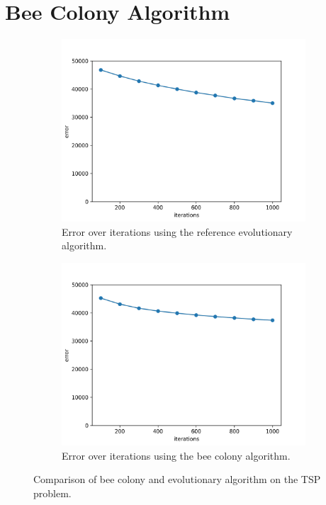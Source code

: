 \section{Bee Colony Algorithm}

\begin{figure}[h]
	\centering
	\begin{subfigure}{.5\textwidth}
		\centering
		\captionsetup{width=0.75\linewidth}
		\includegraphics[width=0.75\linewidth]{assets/reference_tsp.png}
		\caption{Error over iterations using the reference evolutionary algorithm.}
		\label{fig:reference_tsp}
	\end{subfigure}%
	\begin{subfigure}{.5\textwidth}
		\centering
    \captionsetup{width=0.75\linewidth}
		\includegraphics[width=0.75\linewidth]{assets/beecolony_tsp.png}
		\caption{Error over iterations using the bee colony algorithm.}
		\label{fig:becolony_tsp}
	\end{subfigure}
	\caption{Comparison of bee colony and evolutionary algorithm on the TSP problem.}
	\label{fig:bee_vs_ea}
\end{figure}

